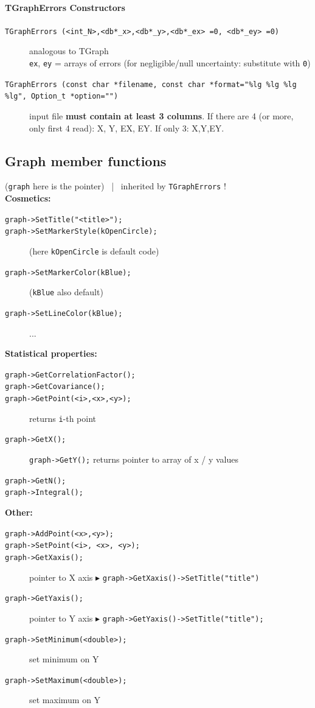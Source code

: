 \documentclass[10pt, twoside]{article}
\newcommand{\ttt}[1]{\colorbox{boxgray}{\texttt{#1}}}
\begin{document}
\paragraph{TGraphErrors Constructors}
\begin{description}
\item[\ttt{TGraphErrors (<int\_N>,<db*\_x>,<db*\_y>,<db*\_ex> =0, <db*\_ey> =0)}] analogous to TGraph \\\ttt{ex}, \ttt{ey} = arrays of errors (for negligible/null uncertainty: substitute with \ttt{0})
\item[\ttt{TGraphErrors (const char *filename, const char *format="\%lg \%lg \%lg \%lg", Option\_t *option="")}] input file \textbf{must contain at least 3 columns}. If there are 4 (or more, only first 4 read): X, Y, EX, EY. If only 3: X,Y,EY.
\end{description}

\subsection{Graph member functions}
(\ttt{graph} here is the pointer) \, | \, inherited by \ttt{TGraphErrors} !\\
\textbf{Cosmetics:}
\begin{description}
\item[\ttt{graph->SetTitle("<title>");}]
\item[\ttt{graph->SetMarkerStyle(kOpenCircle);}] (here \ttt{kOpenCircle} is default code)
\item[\ttt{graph->SetMarkerColor(kBlue);}] (\ttt{kBlue} also default)
\item[\ttt{graph->SetLineColor(kBlue);}] ...
\end{description}
\textbf{Statistical properties:}
\begin{description}
\item[\ttt{graph->GetCorrelationFactor();}]
\item[\ttt{graph->GetCovariance();}]
\item[\ttt{graph->GetPoint(<i>,<x>,<y>);}] returns \ttt{i}-th point
\item[\ttt{graph->GetX();}] \ttt{graph->GetY();} returns pointer to array of x / y values
\item[\ttt{graph->GetN();}]
\item[\ttt{graph->Integral();}]
\end{description}
\textbf{Other:}
\begin{description}
\item[\ttt{graph->AddPoint(<x>,<y>);}]
\item[\ttt{graph->SetPoint(<i>, <x>, <y>);}]
\item[\ttt{graph->GetXaxis();}] pointer to X axis $\blacktriangleright$ \texttt{graph->GetXaxis()->SetTitle("title")}
\item[\ttt{graph->GetYaxis();}] pointer to Y axis $\blacktriangleright$ \texttt{graph->GetYaxis()->SetTitle("title");}
\item[\ttt{graph->SetMinimum(<double>);}] set minimum on Y
\item[\ttt{graph->SetMaximum(<double>);}] set maximum on Y
\end{description}
\end{document}

